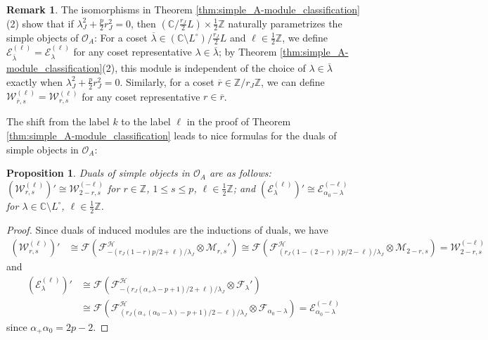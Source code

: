 \documentclass[11pt, reqno]{amsart}
\newtheorem{prop}[thm]{Proposition}
\theoremstyle{definition}\newtheorem{defi}[thm]{Definition}
\theoremstyle{definition}\newtheorem{rem}[thm]{Remark}
\theoremstyle{definition}\newtheorem{exam}[thm]{Example}
\theoremstyle{definition}\newtheorem{assum}[thm]{Assumption}
\newcommand{\cE}{\mathcal{E}}
\newcommand{\cH}{\mathcal{H}}
\newcommand{\cM}{\mathcal{M}}
\newcommand{\cF}{\mathcal{F}}
\newcommand{\cO}{\mathcal{O}}
\newcommand{\cW}{\mathcal{W}}
\newcommand{\CC}{\mathbb{C}}
\newcommand{\ZZ}{\mathbb{Z}}
\begin{document}
\begin{rem}\label{rem:mod_class_for_Bp_and_orbs}
The isomorphisms in Theorem \ref{thm:simple_A-module_classification}(2) show that if $\lambda_J^2+\frac{p}{2}r_J^2=0$, then $(\CC/\frac{r_J}{2} L)\times\frac{1}{2}\ZZ$ naturally parametrizes the simple objects of $\cO_A$: For a coset $\overline{\lambda}\in(\CC\setminus L^\circ)/\frac{r_J}{2} L$ and $\ell\in\frac{1}{2}\ZZ$, we define $\cE_{\overline{\lambda}}^{(\ell)}=\cE_{\lambda}^{(\ell)}$ for any coset representative $\lambda\in\overline{\lambda}$; by Theorem \ref{thm:simple_A-module_classification}(2), this module is independent of the choice of $\lambda\in\overline{\lambda}$ exactly when $\lambda_J^2+\frac{p}{2}r_J^2=0$. Similarly, for a coset $\overline{r}\in\ZZ/r_J\ZZ$, we can define $\cW^{(\ell)}_{\overline{r},s}=\cW_{r,s}^{(\ell)}$ for any coset representative $r\in\overline{r}$.
\end{rem}

The shift from the label $k$ to the label $\ell$ in the proof of Theorem \ref{thm:simple_A-module_classification} leads to nice formulas for the duals of simple objects in $\cO_A$:
\begin{prop}
Duals of simple objects in $\cO_A$ are as follows: $(\cW_{r,s}^{(\ell)})'\cong \cW_{2-r,s}^{(-\ell)}$ for $r\in\ZZ$, $1\leq s\leq p$, $\ell\in\frac{1}{2}\ZZ$; and $(\cE_\lambda^{(\ell)})'\cong\cE_{\alpha_0-\lambda}^{(-\ell)}$ for $\lambda\in\CC\setminus L^\circ$, $\ell\in\frac{1}{2}\ZZ$.
\end{prop}
\begin{proof}
Since duals of induced modules are the inductions of duals, we have
\begin{align*}
(\cW_{r,s}^{(\ell)})' & \cong\cF\left(\cF^\cH_{-(r_J(1-r)p/2+\ell)/\lambda_J}\otimes\cM_{r,s}'\right) \cong\cF\left(\cF^\cH_{(r_J(1-(2-r))p/2-\ell)/\lambda_J}\otimes\cM_{2-r,s}\right) =\cW^{(-\ell)}_{2-r,s}
\end{align*}
and
\begin{align*}
(\cE_\lambda^{(\ell)})' & \cong \cF\left(\cF^\cH_{-(r_J(\alpha_+\lambda-p+1)/2+\ell)/\lambda_J}\otimes\cF_\lambda'\right)\nonumber\\ &\cong\cF\left(\cF^\cH_{(r_J(\alpha_+(\alpha_0-\lambda)-p+1)/2-\ell)/\lambda_J}\otimes\cF_{\alpha_0-\lambda}\right) =\cE^{(-\ell)}_{\alpha_0-\lambda}
\end{align*}
since $\alpha_+\alpha_0=2p-2$.
\end{proof}
\end{document}
